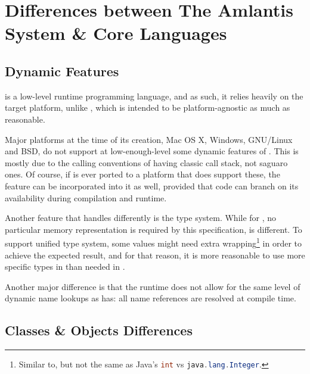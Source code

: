 
\chapter[Differences between The Amlantis System \& Core Languages]{Differences between The Amlantis \\System \& Core Languages}

\minitoc

\newpage

\section{Dynamic Features}

\AmlSystem is a low-level runtime programming language, and as such, it relies heavily on the target platform, unlike \Aml, which is intended to be platform-agnostic as much as reasonable. 

Major platforms at the time of its creation, Mac OS X, Windows, GNU/Linux and BSD, do not support at low-enough-level some dynamic features of \Aml. This is mostly due to the calling conventions of having classic call stack, not saguaro ones. Of course, if \AmlSystem is ever ported to a platform that does support these, the feature can be incorporated into it as well, provided that code can branch on its availability during compilation and runtime. 

Another feature that \AmlSystem handles differently is the type system. While for \Aml, no particular memory representation is required by this specification, \AmlSystem is different. To support unified type system, some values might need extra wrapping\footnote{Similar to, but not the same as Java's \lstinline[language=Java]!int! vs \lstinline[language=Java]!java.lang.Integer!.} in order to achieve the expected result, and for that reason, it is more reasonable to use more specific types in \AmlSystem than needed in \Aml. 

Another major difference is that the \AmlSystem runtime does not allow for the same level of dynamic name lookups as \Aml has: all name references are resolved at compile time. 





\section{Classes \& Objects Differences}

